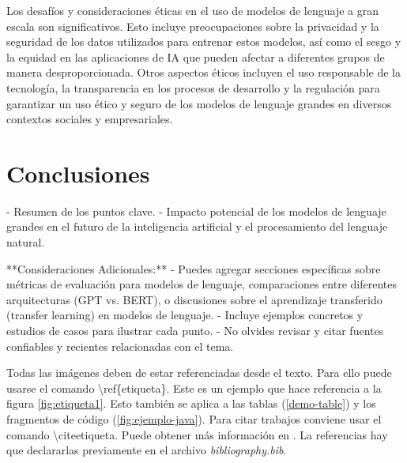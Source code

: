    Los desafíos y consideraciones éticas en el uso de modelos de lenguaje a gran escala son significativos. Esto incluye preocupaciones sobre la privacidad y la seguridad de los datos utilizados para entrenar estos modelos, así como el sesgo y la equidad en las aplicaciones de IA que pueden afectar a diferentes grupos de manera desproporcionada. Otros aspectos éticos incluyen el uso responsable de la tecnología, la transparencia en los procesos de desarrollo y la regulación para garantizar un uso ético y seguro de los modelos de lenguaje grandes en diversos contextos sociales y empresariales.
\section{Conclusiones}

 - Resumen de los puntos clave.
   - Impacto potencial de los modelos de lenguaje grandes en el futuro de la inteligencia artificial y el procesamiento del lenguaje natural.


**Consideraciones Adicionales:**
- Puedes agregar secciones específicas sobre métricas de evaluación para modelos de lenguaje, comparaciones entre diferentes arquitecturas (GPT vs. BERT), o discusiones sobre el aprendizaje transferido (transfer learning) en modelos de lenguaje.
- Incluye ejemplos concretos y estudios de casos para ilustrar cada punto.
- No olvides revisar y citar fuentes confiables y recientes relacionadas con el tema.





Todas las imágenes deben de estar referenciadas desde el texto. Para ello puede usarse el comando \textbackslash ref\{etiqueta\}. Este es un ejemplo que hace referencia a la figura \ref{fig:etiqueta1}. Esto también se aplica a las tablas (\ref{demo-table}) y los fragmentos de código (\ref{fig:ejemplo-java}). Para citar trabajos conviene usar el comando \textbackslash cite{etiqueta}. Puede obtener más información en \cite{greenwade93} \cite{goossens93}. La referencias hay que declararlas previamente en el archivo \textit{bibliography.bib}.



